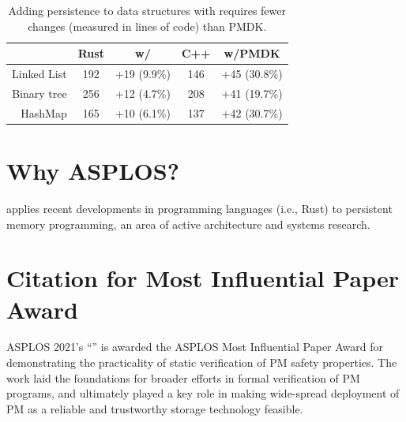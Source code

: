 \documentclass[pageno]{jpaper}
\theoremstyle{invar}
\theoremstyle{goal}
\begin{document}
\begin{table}%
  \center
  \small
  \begin{tabular}{|r||c|c||c|c|}
      \hline
       & Rust & w/\This{} & C++ & w/PMDK \\ \hline\hline
      Linked List & 192&+19 (9.9\%) & 146&+45 (30.8\%)  \\ \hline
      Binary tree & 256&+12 (4.7\%) & 208&+41 (19.7\%) \\ \hline
      HashMap     & 165&+10 (6.1\%)  & 137&+42 (30.7\%) \\ \hline
  \end{tabular}
  \caption{Adding persistence to data structures with \this{} requires fewer changes (measured in lines of code) than PMDK.}
  \label{tab:loc}
\end{table}

\section{Why ASPLOS?}
\label{sec:why-asplos}

\This{} applies recent developments in programming languages (i.e., Rust) to
persistent memory programming, an area of active architecture and systems
research.

\section{Citation for Most Influential Paper Award}
\label{sec:citation}

ASPLOS 2021's ``\papertitle'' is awarded the ASPLOS Most Influential Paper Award
for demonstrating the practicality of static verification of PM safety
properties.  The work laid the foundations for broader efforts in formal
verification of PM programs, and ultimately played a key role in making
wide-spread deployment of PM as a reliable and trustworthy storage technology feasible.
\end{document}
